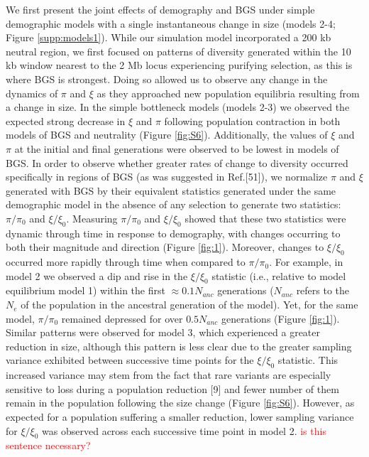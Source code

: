 \documentclass[9pt,twocolumn,twoside]{rilabRxiv}
\newcommand{\jri}[1]{{\small \textcolor{red}{#1}}}
\begin{document}
We first present the joint effects of demography and BGS under simple demographic models with a single  instantaneous change in size (models 2-4; Figure \ref{supp:models1}).
While our simulation model incorporated a 200 kb neutral region, we first focused on patterns of diversity generated within the 10 kb window nearest to the 2 Mb locus experiencing purifying selection, as this is where BGS is strongest.
Doing so allowed us to observe any change in the dynamics of $\pi$ and $\xi$ as they approached new population
equilibria resulting from a change in size.
In the simple bottleneck models (models 2-3) we observed the expected strong decrease in $\xi$ and $\pi$ following  population contraction in both models of BGS and neutrality (Figure \ref{fig:S6}).
Additionally, the values of $\xi$ and $\pi$ at the initial and final generations were observed to be lowest in models of BGS.
In order to observe whether greater rates of change to diversity occurred specifically in regions of BGS (as was suggested in Ref.[51]), we normalize $\pi$ and $\xi$ generated with BGS by their equivalent statistics generated under the same demographic model in the absence of any selection to generate two statistics: $\pi/\pi_0$ and $\xi/\xi_0$.
Measuring $\pi/\pi_0$ and $\xi/\xi_0$ showed that these two statistics were dynamic through time in response to demography, with changes occurring to both their magnitude and direction (Figure \ref{fig:1}).
Moreover, changes to $\xi/\xi_0$ occurred more rapidly through time when compared to $\pi/\pi_0$.
For example, in model 2 we observed a dip and rise in the $\xi/\xi_0$ statistic (i.e., relative to model equilibrium model 1) within the first $\approx 0.1 N_{anc}$ generations ($N_{anc}$ refers to the $N_e$ of the population in the ancestral generation of the model).
Yet, for the same model, $\pi/\pi_0$ remained depressed for over $0.5N_{anc}$ generations (Figure \ref{fig:1}).
Similar patterns were observed for model 3, which experienced a greater reduction in size, although this pattern is less clear due to the greater sampling variance exhibited between successive time points for the $\xi/\xi_0$ statistic.
This increased variance may stem from the fact that rare variants are especially sensitive to loss during a
population reduction [9] and fewer number of them remain in the population following the size change (Figure \ref{fig:S6}).
However, as expected for a population suffering a smaller reduction, lower sampling variance for $\xi/\xi_0$ was observed across each successive time point in model 2. \jri{is this sentence necessary?}
\end{document}
